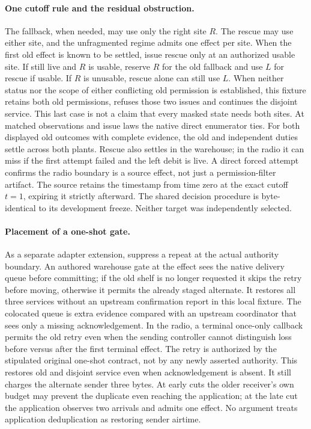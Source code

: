 \documentclass{article}
\begin{document}
\paragraph{One cutoff rule and the residual obstruction.}
The fallback, when needed, may use only the right site $R$. The rescue
may use either site, and the unfragmented regime admits one effect per site.
When the first old effect is known to be settled, issue rescue only at an
authorized usable site. If still live and $R$ is usable, reserve $R$ for
the old fallback and use $L$ for rescue if usable. If $R$ is unusable, rescue
alone can still use $L$. When neither status nor the scope of either
conflicting old permission is established, this fixture retains both old
permissions, refuses those two issues and continues the disjoint service.
This last case is not a claim that every masked state needs both sites.
At matched observations and issue laws the native direct enumerator ties.
For both displayed old outcomes with complete evidence, the old and
independent duties settle across both plants. Rescue also settles in the
warehouse; in the radio it can miss if the first attempt failed and the
left debit is live. A direct forced attempt confirms the radio boundary is
a source effect, not just a permission-filter artifact. The source retains
the timestamp from time zero at the exact cutoff $t=1$, expiring it strictly
afterward. The shared decision procedure is byte-identical to its development
freeze. Neither target was independently selected.

\paragraph{Placement of a one-shot gate.}
As a separate adapter extension, suppress a repeat at the actual authority
boundary. An authored warehouse gate at the effect sees the native delivery
queue before committing; if the old shelf is no longer requested it skips
the retry before moving, otherwise it permits the already staged alternate.
It restores all three services without an upstream confirmation report in
this local fixture. The colocated queue is extra evidence compared with an
upstream coordinator that sees only a missing acknowledgement.
In the radio, a terminal once-only callback permits the old retry even when
the sending controller cannot distinguish loss before versus after the first
terminal effect. The retry is authorized by the stipulated original one-shot
contract, not by any newly asserted authority. This restores old and disjoint
service even when acknowledgement is absent. It still charges the alternate
sender three bytes. At early cuts the older receiver's own budget may prevent
the duplicate even reaching the application; at the late cut the application
observes two arrivals and admits one effect. No argument treats application
deduplication as restoring sender airtime.
\end{document}
